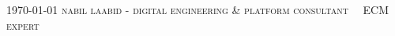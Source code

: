 \documentclass[localFont,alternative,10pt,compact]{yaac-another-awesome-cv}
\begin{document}
	\makecvheader

	\makecvfooter
		{\textsc{\today}} %
		{\textsc{nabil laabid - digital engineering \& platform consultant \ \textbar \ ECM expert}}
		{\thepage}


	
\end{document}
